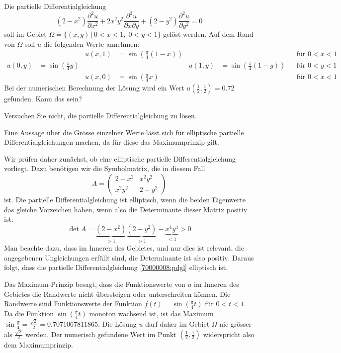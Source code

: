 Die partielle Differentialgleichung
\begin{equation}
(2-x^2)\frac{\partial^2 u}{\partial x^2}
+
2x^2y^2\frac{\partial^2 u}{\partial x\partial y}
+
(2-y^2)\frac{\partial^2 u}{\partial y^2}
=0
\label{70000008:pdgl}
\end{equation}
soll im Gebiet $\Omega=\{(x,y)\,|\, 0< x<1,\; 0<y<1\}$ gelöst
werden. Auf dem Rand von $\Omega$ soll $u$ die folgenden Werte
annehmen:
\begin{align*}
&
	&u(x,1)&=\sin({\textstyle\frac\pi4}(1-x))
		&&
			&&\text{für $0<x<1$}\\
u(0,y)&=\sin({\textstyle\frac\pi4}y)
	&&
		&u(1,y)&=\sin({\textstyle\frac\pi4}(1-y))
			&&\text{für $0<y<1$}\\
&
	&u(x,0)&=\sin({\textstyle\frac\pi4} x)
		&&                
			&&\text{für $0<x<1$}
\end{align*}
Bei der numerischen Berechnung der Lösung wird ein Wert
$u(\frac12,\frac12)=0.72$ gefunden. Kann das sein?

\begin{hinweis}
Versuchen Sie nicht, die partielle Differentialgleichung zu lösen.
\end{hinweis}

\begin{loesung}
Eine Aussage über die Grösse einzelner Werte lässt sich für
elliptische partielle Differentialgleichungen machen, da für diese das
Maximumprinzip gilt.

Wir prüfen daher zunächst, ob eine elliptische
partielle Differentialgleichung vorliegt. Dazu benötigen wir die
Symbolmatrix, die in diesem Fall 
\[
A=\begin{pmatrix}
2-x^2 &x^2y^2\\
x^2y^2&2-y^2
\end{pmatrix}
\]
ist. Die partielle Differentialgleichung ist elliptisch, wenn die
beiden Eigenwerte das gleiche Vorzeichen haben, wenn also die Determinante
dieser Matrix positiv ist:
\[
\det A=\underbrace{(2-x^2)}_{> 1}\underbrace{(2-y^2)}_{> 1}-\underbrace{x^4y^4}_{< 1}>0
\]
Man beachte dazu, dass im Inneren des Gebietes, und nur dies ist relevant,
die angegebenen Ungleichungen erfüllt sind, die Determinante ist also
positiv.
Daraus folgt, dass die partielle Differentialgleichung \eqref{70000008:pdgl}
elliptisch ist.

Das Maximum-Prinzip besagt, dass die Funktionswerte von $u$ im Inneren
des Gebietes die Randwerte nicht übersteigen oder unterschreiten
können. Die Randwerte sind Funktionswerte der Funktion $f(t)=\sin(\frac\pi4t)$
für $0<t<1$. Da die Funktion $\sin(\frac\pi4t)$ monoton wachsend ist, ist das
Maximum $\sin\frac\pi4=\frac{\sqrt{2}}2=0.7071067811865$.
Die Lösung $u$ darf daher im Gebiet $\Omega$ nie grösser als
$\frac{\sqrt{2}}2$ werden. Der numerisch gefundene Wert im Punkt
$(\frac12,\frac12)$ widerspricht also dem Maximumprinzip.
\end{loesung}

